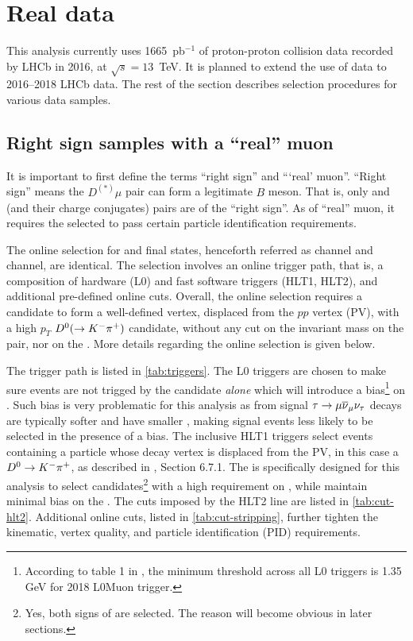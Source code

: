 \section{Real data}
\label{ref:sel:data}

This analysis currently uses 1665~pb$^{-1}$ of proton-proton collision data
recorded by LHCb in 2016, at $\sqrt{s} = 13$~TeV.
It is planned to extend the use of data to 2016--2018 LHCb data.
The rest of the section describes selection procedures for various data samples.


\subsection{Right sign samples with a ``real'' muon}
\label{ref:sel:data:rs}

It is important to first define the terms ``right sign'' and ```real' muon''.
``Right sign'' means the $D^{(*)} \mu$ pair can form a legitimate $B$ meson.
That is, only \Dz\mun and \Dstarp\mun (and their charge conjugates) pairs are
of the ``right sign''.
As of ``real'' muon, it requires the selected \muon to pass certain particle
identification requirements.

The online selection for \Dz\mun and \Dstarp\mun final states,
henceforth referred as \Dz channel and \Dstar channel,
are identical.
The selection involves an online trigger path,
that is,
a composition of hardware (L0) and fast software triggers (HLT1, HLT2),
and additional pre-defined online cuts.
Overall, the online selection requires a \muon candidate to form
a well-defined vertex,
displaced from the $pp$ vertex (PV),
with a high $p_T$ ${{D}^0} (\rightarrow {\ensuremath{{K}^-}} {\ensuremath{{\pi}^+}})$ candidate, without any cut on the
invariant mass on the \Dz\mupm pair, nor on the \muon \pt.
More details regarding the online selection is given below.

The trigger path is listed in \cref{tab:triggers}.
The L0 triggers are chosen to make sure events are not trigged by
the \muon candidate \emph{alone} which will introduce a \pt bias\footnote{
    According to table 1 in \cite{LHCb-DP-2019-001},
    the minimum \pt threshold across all L0 triggers is 1.35 GeV for 2018
    L0Muon trigger.
} on \muon.
Such bias is very problematic for this analysis as \muon from signal
${\tau} \rightarrow {\ensuremath{\mu}} {\ensuremath{{\overline{\nu}}_\mu}} {\ensuremath{{\nu}_\tau}}$ decays are typically softer and
have smaller \pt,
making signal events less likely to be selected in the presence of a \pt bias.
The inclusive HLT1 triggers select events containing a particle whose decay
vertex is displaced from the PV,
in this case a ${{D}^0} \rightarrow {\ensuremath{{K}^-}} {\ensuremath{{\pi}^+}}$,
as described in \cite{LHCb-INT-2019-025}, Section 6.7.1.
The  is specifically designed for this analysis
to select \Dz\mupm candidates\footnote{
    Yes, both signs of \muon are selected.
    The reason will become obvious in later sections.
} with a high \pt requirement on \Dz,
while maintain minimal \pt bias on the \mupm.
The cuts imposed by the HLT2 line are listed in \cref{tab:cut-hlt2}.
Additional online cuts,
listed in \cref{tab:cut-stripping},
further tighten the kinematic, vertex quality, and particle identification (PID)
requirements.


